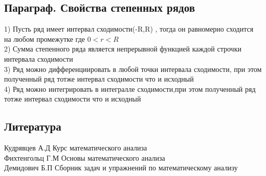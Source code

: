 \documentclass[a4paper, 12pt]{article}
\begin{document}
\subsection{Параграф. Свойства степенных рядов}
1) Пусть ряд имеет интервал сходимости(-R,R) , тогда он равномерно сходится на любом промежутке где $ 0<r<R $\\
2) Сумма степенного ряда является непрерывной функцией каждой строчки интервала сходимости\\
3) Ряд можно дифференциировать в любой точки интервала сходимости, при этом полученный ряд тотже интервал сходимости что и исходный \\
4) Ряд можно интегрировать в интегралле сходимости,при этом полученный ряд тотже интервал сходимости что и исходный\\ 











\newpage
\subsection*{Литература}
Кудрявцев А.Д Курс математического анализа\\
Фихтенгольц Г.М Основы математического анализа\\
Демидович Б.П Сборник задач и упражнений по математическому анализу\\
\end{document}
